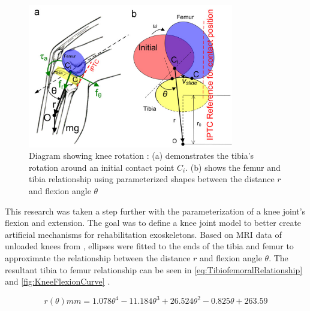 \begin{figure}[ht!]
    \centering
    \includegraphics[width=0.8\textwidth]{Figures/Background/KneeParameterization.png}
    \caption{Diagram showing knee rotation \cite{KinDynKneeJoint}: (a) demonstrates the tibia's rotation around an initial contact point \(C_i\). (b) shows the femur and tibia relationship using parameterized shapes between the distance \(r\) and flexion angle \(\theta\)}
    \label{fig:KneeParameterization}
\end{figure}

This research was taken a step further with the parameterization of a knee joint's flexion and extension. The goal was to define a knee joint model to better create artificial mechanisms for rehabilitation exoskeletons. Based on MRI data of unloaded knees from \cite{MRIKneeShape_Unloaded}, ellipses were fitted to the ends of the tibia and femur to approximate the relationship between the distance \(r\) and flexion angle \(\theta\). The resultant tibia to femur relationship can be seen in \autoref{eq:TibiofemoralRelationship} and \autoref{fig:KneeFlexionCurve} \cite{KinDynKneeJoint}.

\begin{equation}
    r(\theta) mm = 1.078\theta^4 - 11.184\theta^3 + 26.524\theta^2 - 0.825\theta + 263.59
    \label{eq:TibiofemoralRelationship}
\end{equation}

